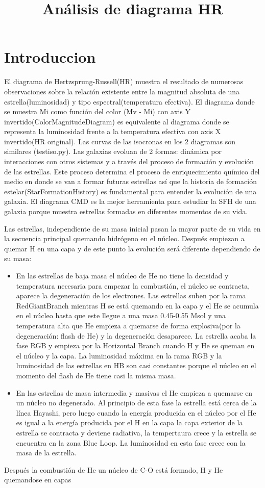\documentclass[10pt]{book}
\title{Análisis de diagrama HR}
\date{}
\begin{document}
\section*{Introduccion}



  El diagrama de Hertzsprung-Russell(HR) muestra el resultado de numerosas observaciones sobre la relación existente entre la magnitud absoluta de una estrella(luminosidad) y tipo espectral(temperatura efectiva).
El diagrama donde se muestra Mi como función del color (Mv - Mi) con axis Y invertido(ColorMagnitudeDiagram) es equivalente al diagrama donde se representa la luminosidad frente a la temperatura efectiva con axis X invertido(HR original). Las curvas de las isocronas en los 2 diagramas son similares (testiso.py). 
Las galaxias evoluan de 2 formas: dinámica por interacciones con otros sistemas y a través del proceso de formación y evolución de las estrellas. Este proceso determina el proceso de enriquecimiento químico del medio en donde se van a formar futuras estrellas así que la historia de formación estelar(StarFormationHistory) es fundamental para entender la evolución de una galaxia. 
El diagrama CMD es la mejor herramienta para estudiar la SFH de
una galaxia porque muestra estrellas formadas en diferentes momentos de su vida.

Las estrellas, independiente de su masa inicial pasan la mayor parte de su vida en la secuencia principal quemando hidrógeno en el núcleo. Después empiezan a quemar H en una capa y de este punto la evolución será diferente dependiendo de su masa:
\begin{itemize}
\item En las estrellas de baja masa el núcleo de He no tiene la densidad y temperatura necesaria para empezar la combustión, el núcleo se contracta, aparece la degeneración de los electrones. 
Las estrellas suben por la rama RedGiantBranch mientras H se está quemando en la capa y el He se acumula en el núcleo hasta que este llegue a una masa 0.45-0.55 Msol y una temperatura alta  que He empieza a quemarse de forma explosiva(por la degeneración: flash de He) y la degeneración desaparece. La estrella acaba la fase RGB y empieza por la Horizontal Branch cuando H y He se queman en el núcleo y la capa. La luminosidad máxima en la rama RGB y la luminosidad de las estrellas en HB son casi constantes porque el núcleo en el momento del flash de He  tiene casi la misma masa.
\item En las estrellas de masa intermedia y masivas el He empieza a quemarse en un núcleo no degenerado. Al principio de esta fase la estrella está cerca de la línea Hayashi, pero luego cuando la energía producida en el núcleo por el He es igual a la energía producida por el H en la capa la capa exterior de la estrella se contracta y deviene radiativa, la tempertaura crece y la estrella se encuentra en la zona Blue Loop. La luminosidad en esta fase crece con la masa de la estrella.
\end{itemize}
Después la combustión de He un núcleo de C-O está formado, H y He quemandose en capas
\end{document}
